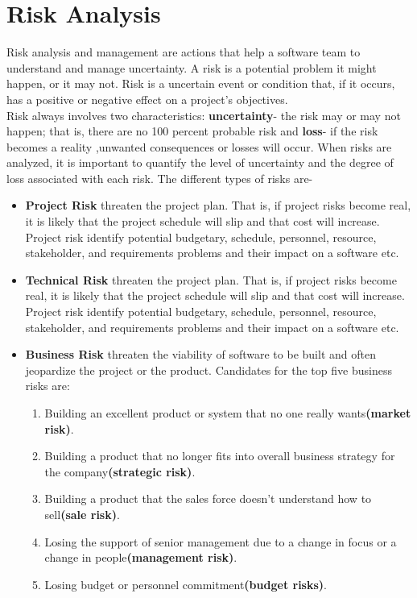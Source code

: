 \section{Risk Analysis}

Risk analysis and management are actions that help a software team to understand and
manage uncertainty. A risk is a potential problem it might happen, or it may not. Risk is a uncertain event or condition that, if it occurs, has a positive or negative effect on a project’s objectives.\\
Risk always involves two characteristics: \textbf{uncertainty}- the risk may or may not happen; that is, there are no 100 percent probable risk and \textbf{loss}- if the risk becomes a reality ,unwanted consequences or losses will occur. When risks are analyzed, it is important to quantify the level of uncertainty and the degree of loss associated with each risk. The different types of risks are-\\

\begin{itemize}
    
    \item \textbf{Project Risk} threaten the project plan. That is, if project risks become real, it is likely that the project schedule will slip and that cost will increase. Project risk identify potential budgetary, schedule, personnel, resource, stakeholder, and requirements problems and their impact on a software etc.

    \item \textbf{Technical Risk} threaten the project plan. That is, if project risks become real, it is likely that the project schedule will slip and that cost will increase. Project risk identify potential budgetary, schedule, personnel, resource, stakeholder, and requirements problems and their impact on a software etc.

    
    \item \textbf{Business Risk} threaten the viability of software to be built and often jeopardize the project or the product. Candidates for the top five business risks are:
    
        \begin{enumerate}
            \item Building an excellent product or system that no one really wants\textbf{(market risk)}.
            \item Building a product that no longer fits into overall business strategy for the company\textbf{(strategic risk)}.
            \item Building a product that the sales force doesn’t understand how to sell\textbf{(sale risk)}.
            \item Losing the support of senior management due to a change in focus or a change in people\textbf{(management risk)}.
            \item  Losing budget or personnel commitment\textbf{(budget risks)}.
    
        \end{enumerate}
        
\end{itemize}

